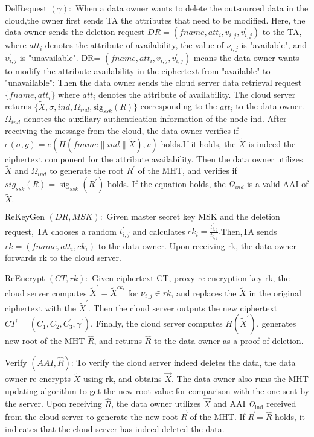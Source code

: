 \documentclass[runningheads]{llncs}
\begin{document}
DelRequest $(\gamma){:}$ When a data owner wants to delete the outsourced data in the cloud,the owner first sends TA the attributes that need to be modified. Here, the data owner sends the deletion request $DR=(fname,att_i,v_{i,j},v_{i,j}^{\prime})$ to the TA, where $att_i$ denotes the attribute of availability, the value of $\nu_{i,j}$ is "available", and $\upsilon_{i,j}^{\prime}$ is "unavailable". DR= $(fname,att_{i},v_{i,j},v_{i,j}^{\prime})$ means the data owner wants to modify the attribute availability in the ciphertext from "available" to "unavailable": Then the data owner sends the cloud server data retrieval request $\{fname,att_i\}$ where $att_i$ denotes the attribute of availability. The cloud server returns $\{ \tilde{X} , \sigma , ind, \Omega _{ind}, \mathrm{sig}_{ssk}(R) \}$ corresponding to the $att_i$ to the data owner. $\Omega _{ind}$ denotes the auxiliary authentication information of the node ind. After receiving the message from the cloud, the data owner verifies if $e(\sigma,g)=e(H(fname\parallel ind\parallel\widetilde{X}),v)$ holds.If it holds, the $\widetilde{X}$ is indeed the ciphertext component for the attribute availability. Then the data owner utilizes $\widetilde{X}$ and $\Omega_{ind}$ to generate the root $R^\prime$ of the MHT, and verifies if $sig_{ssk}(R)=\operatorname{sig}_{ssk}(R^{\prime})$ holds. If the equation holds, the $\Omega_{ind}$ is a valid AAI of $\widetilde{X}.$


ReKeyGen $(DR,MSK):$ Given master secret key MSK and the deletion request, TA chooses a random $t_{i,j}^{\prime}$ and calculates $ck_{i}=\frac{t_{i,j}^{\prime}}{t_{i,j}}.$Then,TA sends $rk=(fname,att_{i},ck_{i})$ to the data owner. Upon receiving rk, the data owner forwards rk to the cloud server.

ReEncrypt $(CT,rk):$ Given ciphertext CT, proxy re-encryption key rk, the cloud server computes $\widetilde{X}^{\prime}=\widetilde{X}^{ck_i}$ for $\nu_{i,j}\in rk$, and replaces the $\widetilde{X}$ in the original ciphertext with the $\widetilde{X}^{\prime}.$ Then the cloud server outputs the new ciphertext $CT^{\prime}=(C_1,C_2,C_3^{\prime},\gamma^{\prime}).$ Finally, the cloud server computes $H(\tilde{X}^{\prime})$, generates new root of the MHT $\hat{R}$, and returns $\hat{R}$ to the data owner as a proof of deletion.

Verify $(AAI,\hat{R})$: To verify the cloud server indeed deletes the data, the data owner re-encrypts $\tilde{X}$ using rk, and obtains $\overrightarrow{X}.$ The data owner also runs the MHT updating algorithm to get the new root value for comparison with the one sent by the server. Upon receiving $\hat{R}$, the data owner utilizes $\overrightarrow{X}$ and AAI $\Omega_\mathrm{ind}$ received from the cloud server to generate the new root $\overrightarrow{R}$ of the MHT. If $\overrightarrow{R}=\hat{R}$ holds, it indicates that the cloud server has indeed deleted the data.
\end{document}
